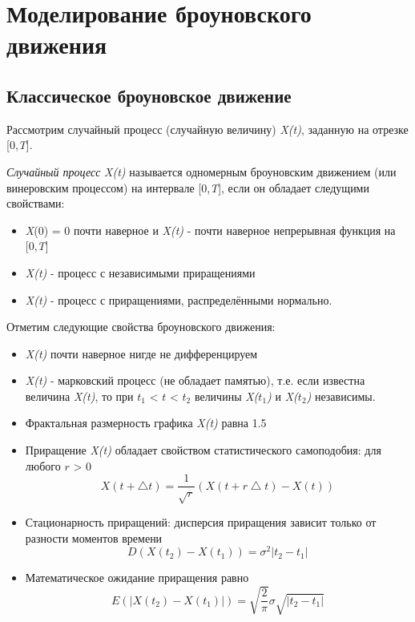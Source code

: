 \section{Моделирование броуновского движения}

\subsection{Классическое броуновское движение}

Рассмотрим случайный процесс (случайную величину) \textit{X(t)}, заданную на отрезке [0,\textit{T}].

\textit{Случайный процесс}  \textit{X(t)} называется одномерным броуновским движением (или винеровским процессом) на интервале [0,\textit{T}], если он обладает следущими свойствами:
\begin{itemize} 
	\item \textit{X}(0) = 0 почти наверное и \textit{X(t)} - почти наверное непрерывная функция на [0,\textit{T}]
	\item \textit{X(t)} - процесс с независимыми приращениями
	\item  \textit{X(t)} -  процесс с приращениями, распределёнными нормально.
\end{itemize}

Отметим следующие свойства броуновского движения:
\begin{itemize} 
	\item \textit{X(t)} почти наверное нигде не дифференцируем 
	\item  \textit{X(t)} - марковский процесс (не обладает памятью), т.е. если известна величина \textit{X(t)}, то при $t_1$ < $t$ < $t_2$ величины \textit{X($t_1$)} и \textit{X($t_2$)} независимы.
	\item Фрактальная размерность графика \textit{X(t)} равна 1.5
	\item Приращение \textit{X(t)} обладает свойством статистического самоподобия: для любого $r$ > 0
	\begin{equation}
		X(t+ \bigtriangleup t) = \frac{1}{\sqrt{r}}(X(t+r\bigtriangleup t) - X(t))
	\end{equation}
	\item Стационарность приращений: дисперсия приращения зависит только от разности моментов времени
	\begin{equation} \label{1.6}
		D(X(t_2) - X(t_1)) = \sigma^2|t_2-t_1|
	\end{equation}
	\item Математическое ожидание приращения равно
	\begin{equation}
		E(|X(t_2) - X(t_1)|) = \sqrt{\frac{2}{\pi}}\sigma\sqrt{|t_2-t_1|}
	\end{equation}
\end{itemize}

